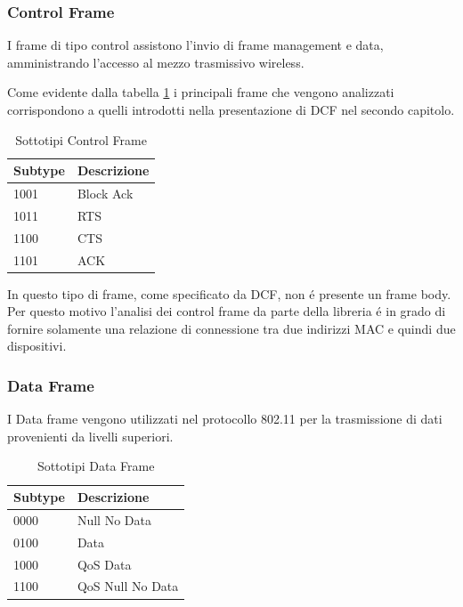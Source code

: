 \subsubsection{Control Frame}

I frame di tipo control assistono l'invio di frame management e data, amministrando l'accesso al mezzo trasmissivo wireless.

Come evidente dalla tabella \ref{table:controlframes} i principali frame che vengono analizzati corrispondono a quelli introdotti nella presentazione di DCF nel secondo capitolo.
\begin{table}[h]
\centering
\begin{tabular}{| l | l |}
	\hline
	Subtype  & Descrizione \\ \hline
	1001	 & Block Ack 	\\ \hline
	1011	 & RTS \\ \hline
	1100 &	CTS \\ \hline
	1101	& ACK \\ \hline
\end{tabular}
\centering
\caption{Sottotipi Control Frame}
\label{table:controlframes}
\end{table}

In questo tipo di frame, come specificato da DCF, non \'e presente un frame body.
Per questo motivo l'analisi dei control frame da parte della libreria \'e in grado di fornire solamente una relazione di connessione tra due indirizzi MAC e quindi due dispositivi.

\subsubsection{Data Frame}

I Data frame vengono utilizzati nel protocollo 802.11 per la trasmissione di dati provenienti da livelli superiori.

\begin{table}
\centering
\begin{tabular}{| l | l |}
	\hline
	Subtype  & Descrizione \\ \hline
	0000	 & Null No Data 	\\ \hline
	0100	 & Data \\ \hline
	1000 &	QoS Data \\ \hline
	1100	& QoS Null No Data \\ \hline
\end{tabular}
\centering
\caption{Sottotipi Data Frame}
\label{table:dataframes}
\end{table}


